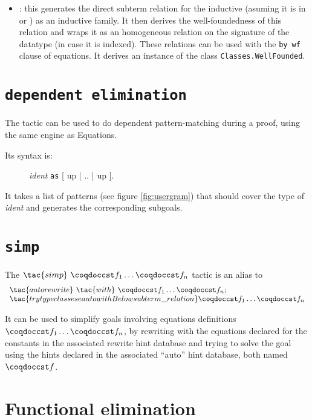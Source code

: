 \begin{itemize}
\item {}: this generates the direct subterm relation for the
  inductive (asuming it is in  or ) as an inductive family.
  It then derives the well-foundedness of this relation and wraps it
  as an homogeneous relation on the signature of the datatype (in case
  it is indexed). These relations can be used with the \texttt{by wf}
  clause of equations. It derives an instance of the class
  \texttt{Classes.WellFounded}.

\end{itemize}

\section{\texttt{dependent elimination}}

The  tactic can be used to do dependent
pattern-matching during a proof, using the same engine as Equations.

Its syntax is:
\begin{figure}[h]
   \textit{ident} \texttt{as} [ up | .. | up ].
\end{figure}

It takes a list of patterns (see figure \ref{fig:usergram}) that should cover the type of \textit{ident}
and generates the corresponding subgoals.


\section{\texttt{simp}}

The $\tac{simp}~\cst{f}_1 \ldots \cst{f}_n$ tactic is an alias to
\[\begin{array}{l}
  \tac{autorewrite}~\tac{with}~\cst{f}_1 \ldots \cst{f}_n ; \\
  \tac{try typeclasses eauto with Below subterm\_relation }\cst{f}_1
  \ldots \cst{f}_n
\end{array}\]

It can be used to simplify goals involving equations definitions
$\cst{f}_1 \ldots \cst{f}_n$, by rewriting with the equations declared
for the constants in the associated rewrite hint database and trying to
solve the goal using the hints declared in the associated ``auto'' hint
database, both named $\cst{f}$.

\section{Functional elimination}

